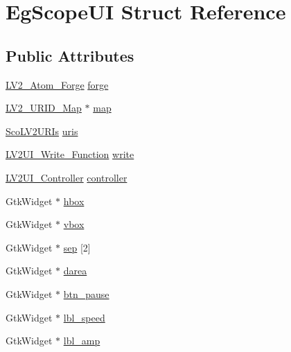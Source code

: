 \hypertarget{struct_eg_scope_u_i}{}\section{Eg\+Scope\+UI Struct Reference}
\label{struct_eg_scope_u_i}
\subsection*{Public Attributes}
\begin{DoxyCompactItemize}
\item 
\hyperlink{struct_l_v2___atom___forge}{L\+V2\+\_\+\+Atom\+\_\+\+Forge} \hyperlink{struct_eg_scope_u_i_a95b883299aeb59de648cd9eb1c5ee4b7}{forge}
\item 
\hyperlink{urid_8h_afefb42cd271f750506a8739f73c098c5}{L\+V2\+\_\+\+U\+R\+I\+D\+\_\+\+Map} $\ast$ \hyperlink{struct_eg_scope_u_i_ab1483761a25285a31b0800a873eeca7b}{map}
\item 
\hyperlink{struct_sco_l_v2_u_r_is}{Sco\+L\+V2\+U\+R\+Is} \hyperlink{struct_eg_scope_u_i_a0e56ac30eb210a280ea719659c59674c}{uris}
\item 
\hyperlink{ui_8h_a62502987d06bc97ea88521aacc0990c9}{L\+V2\+U\+I\+\_\+\+Write\+\_\+\+Function} \hyperlink{struct_eg_scope_u_i_a4ab44dde19ac32296cdc4b9fe91d7450}{write}
\item 
\hyperlink{ui_8h_a055fb969db1ceb4a345b6548a03c5876}{L\+V2\+U\+I\+\_\+\+Controller} \hyperlink{struct_eg_scope_u_i_aae073bd753ec8a1a1df78586536a3df2}{controller}
\item 
Gtk\+Widget $\ast$ \hyperlink{struct_eg_scope_u_i_af374e694ac004b0124516e9f494a1563}{hbox}
\item 
Gtk\+Widget $\ast$ \hyperlink{struct_eg_scope_u_i_afe2aa5cca0531d988ac0b4b226deb317}{vbox}
\item 
Gtk\+Widget $\ast$ \hyperlink{struct_eg_scope_u_i_a4cd6d5cbbd16186c2ce8a90d8aed5e13}{sep} \mbox{[}2\mbox{]}
\item 
Gtk\+Widget $\ast$ \hyperlink{struct_eg_scope_u_i_a9e1d58c0eb584c74ac10a811ad9409c7}{darea}
\item 
Gtk\+Widget $\ast$ \hyperlink{struct_eg_scope_u_i_afdda0e3c91851370d2b294730196037f}{btn\+\_\+pause}
\item 
Gtk\+Widget $\ast$ \hyperlink{struct_eg_scope_u_i_ab60272091a3aef032244a62129664b9c}{lbl\+\_\+speed}
\item 
Gtk\+Widget $\ast$ \hyperlink{struct_eg_scope_u_i_a2b0f9e0f1e8025a27a2111c93cc7a5f7}{lbl\+\_\+amp}
\item 

\end{DoxyCompactItemize}
